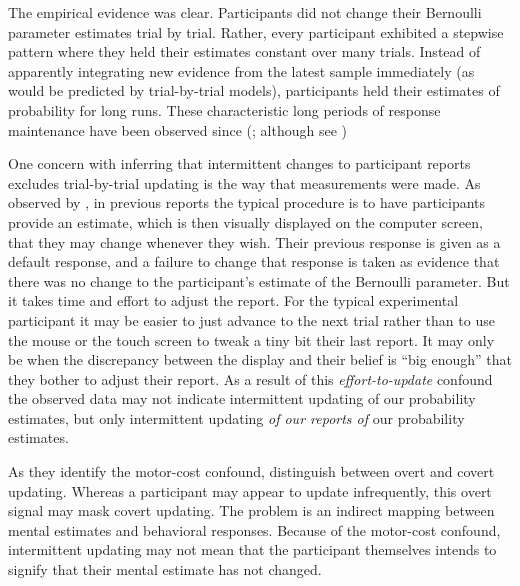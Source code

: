 \documentclass[sn-apa]{sn-jnl}\usepackage[]{graphicx}\usepackage[]{xcolor}
\begin{document}
The empirical evidence was clear. Participants did not change their Bernoulli parameter estimates trial by trial. Rather, every participant exhibited a stepwise pattern where they held their estimates constant over many trials. Instead of apparently integrating new evidence from the latest sample immediately (as would be predicted by trial-by-trial models), participants held their estimates of probability for long runs. These characteristic long periods of response maintenance have been observed since (\citealp{robinson1964,gallistel2014,ricci2017,khaw2017,carrabin2021}; although see \citealp{forsgren2023further})

One concern with inferring that intermittent changes to participant reports excludes trial-by-trial updating is the way that measurements were made. As observed by \cite{forsgren2023further}, in previous reports the typical procedure is to have participants provide an estimate, which is then visually displayed on the computer screen, that they may change whenever they wish. Their previous response is given as a default response, and a failure to change that response is taken as evidence that there was no change to the participant's estimate of the Bernoulli parameter. But it takes time and effort to adjust the report. For the typical experimental participant it may be easier to just advance to the next trial rather than to use the mouse or the touch screen to tweak a tiny bit their last report. It may only be when the discrepancy between the display and their belief is ``big enough'' that they bother to adjust their report. As a result of this \emph{effort-to-update} confound the observed data may not indicate intermittent updating of our probability estimates, but only intermittent updating \emph{of our reports of} our  probability estimates.

As they identify the motor-cost confound, \cite{forsgren2023further} distinguish between overt and covert updating. Whereas a participant may appear to update infrequently, this overt signal may mask covert updating. The problem is an indirect mapping between mental estimates and behavioral responses. Because of the motor-cost confound, intermittent updating may not mean that the participant themselves intends to signify that their mental estimate has not changed. 
\end{document}
